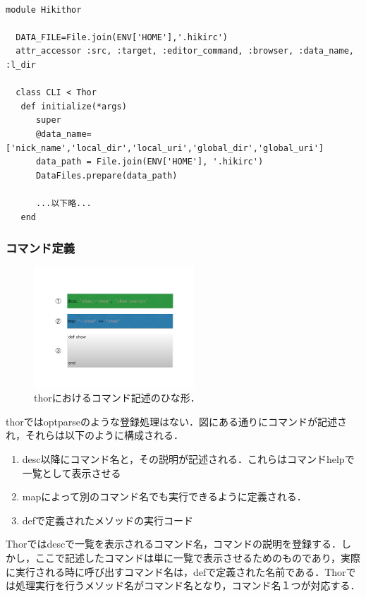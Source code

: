 \begin{lstlisting}[style=customRuby]

module Hikithor

  DATA_FILE=File.join(ENV['HOME'],'.hikirc')
  attr_accessor :src, :target, :editor_command, :browser, :data_name, :l_dir

  class CLI < Thor
   def initialize(*args)
      super
      @data_name=['nick_name','local_dir','local_uri','global_dir','global_uri']
      data_path = File.join(ENV['HOME'], '.hikirc')
      DataFiles.prepare(data_path)

      ...以下略...
   end
\end{lstlisting}
\subsubsection{コマンド定義}
\begin{figure}[htbp]\begin{center}
\includegraphics[width=6cm,bb=0 0 442 432]{../figs/./hikiutils_yamane_09_copy.004.jpg}
\caption{thorにおけるコマンド記述のひな形．}
\label{default}\end{center}\end{figure}
thorではoptparseのような登録処理はない．図にある通りにコマンドが記述され，それらは以下のように構成される．
\begin{enumerate}
\item desc以降にコマンド名と，その説明が記述される．これらはコマンドhelpで一覧として表示させる
\item mapによって別のコマンド名でも実行できるように定義される．
\item defで定義されたメソッドの実行コード
\end{enumerate}
Thorではdescで一覧を表示されるコマンド名，コマンドの説明を登録する．しかし，ここで記述したコマンドは単に一覧で表示させるためのものであり，実際に実行される時に呼び出すコマンド名は，defで定義された名前である．Thorでは処理実行を行うメソッド名がコマンド名となり，コマンド名１つが対応する．


